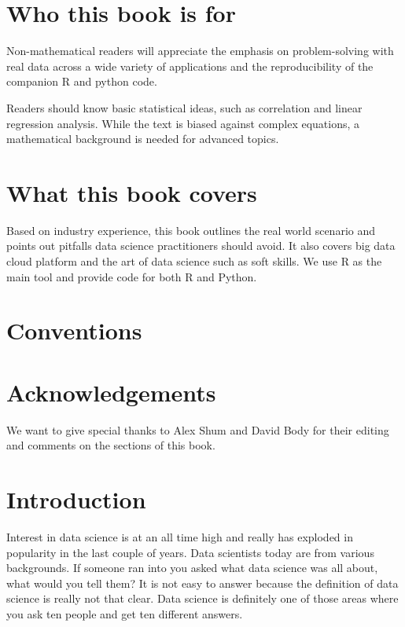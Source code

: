 \documentclass[12pt,]{krantz}
\theoremstyle{definition}
\theoremstyle{definition}
\theoremstyle{remark}
\begin{document}
\chapter*{Who this book is for}\label{who-this-book-is-for}


Non-mathematical readers will appreciate the emphasis on problem-solving
with real data across a wide variety of applications and the
reproducibility of the companion R and python code.

Readers should know basic statistical ideas, such as correlation and
linear regression analysis. While the text is biased against complex
equations, a mathematical background is needed for advanced topics.

\chapter*{What this book covers}\label{what-this-book-covers}


Based on industry experience, this book outlines the real world scenario
and points out pitfalls data science practitioners should avoid. It also
covers big data cloud platform and the art of data science such as soft
skills. We use R as the main tool and provide code for both R and
Python.

\chapter*{Conventions}\label{conventions}


\chapter*{Acknowledgements}\label{acknowledgements}


We want to give special thanks to Alex Shum and David Body for their
editing and comments on the sections of this book.

\mainmatter

\chapter{Introduction}\label{introduction}

Interest in data science is at an all time high and really has exploded
in popularity in the last couple of years. Data scientists today are
from various backgrounds. If someone ran into you asked what data
science was all about, what would you tell them? It is not easy to
answer because the definition of data science is really not that clear.
Data science is definitely one of those areas where you ask ten people
and get ten different answers.
\end{document}
